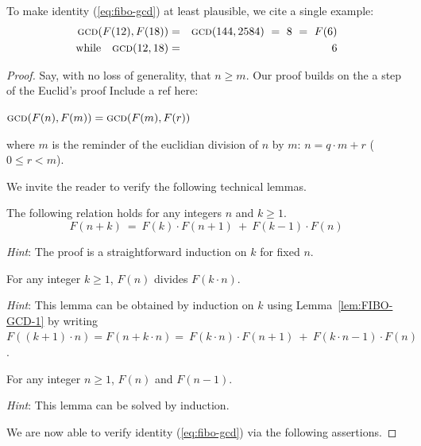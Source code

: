 \smallskip

\noindent
To make identity (\ref{eq:fibo-gcd}) at least plausible, we cite a single example:
\begin{eqnarray*}
\mbox{\sc gcd}(F(12), F(18)) & = & \mbox{\sc gcd}(144,2584) \ = \ 8 \ = \ F(6) \\
\mbox{while } \ \ \mbox{\sc gcd}(12,18) & = & 6
\end{eqnarray*}

\medskip

\begin{proof}
Say, with no loss of generality,  that $n \geq m$.  
Our proof builds on the a step of the Euclid's proof
{\Denis Include a ref here}:

$\mbox{\sc gcd}(F(n),F(m)) = \mbox{\sc gcd}(F(m), F(r))$

where $m$ is the reminder of the euclidian division of $n$ by $m$: $n=q \cdot m + r$ ($0 \leq r < m$).

\medskip

\noindent
We invite the reader to verify the following technical lemmas.


\begin{lemma}
\label{lem:FIBO-GCD-1}
The following relation holds for any integers $n$ and $k \geq 1$.
\[  F(n+k) \ = \ F(k) \cdot F(n+1) \ + \ F(k-1) \cdot F(n) \] 
\end{lemma}

\noindent
{\em Hint}: The proof is a straightforward induction on $k$ for fixed $n$.

\begin{lemma}
\label{lem:FIBO-GCD-2}
For any integer $k \geq 1$, $F(n)$ divides $F(k \cdot n)$.
\end{lemma}

\noindent
{\em Hint}: This lemma can be obtained by induction on $k$ using Lemma~\ref{lem:FIBO-GCD-1}
by writing $F((k+1) \cdot n) = F(n + k \cdot n) = \ F(k \cdot n) \cdot F(n+1) \ + \ F(k \cdot n - 1) \cdot F(n)$.

\begin{lemma}
\label{lem:FIBO-GCD-3}
For any integer $n \geq 1$, $F(n)$ and $F(n-1)$.
\end{lemma}

\noindent
{\em Hint}: This lemma can be solved by induction. 

\bigskip

\noindent
We are now able to verify identity (\ref{eq:fibo-gcd}) via the following assertions.


\end{proof}

